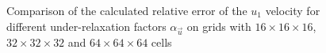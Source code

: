\begin{figure}[h!]
\caption{Comparison of the calculated relative error of the $u_1$ velocity for different under-relaxation factors $\alpha_\vec{u}$ on grids with $16\times16\times16$, $32\times32\times32$ and $64\times64\times64$ cells}
\label{fig:underrelaxation}
\end{figure}
